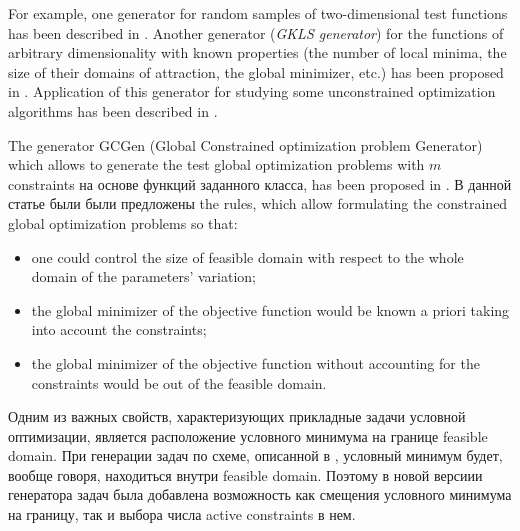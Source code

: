 \documentclass{aip-cp}
\begin{document}
For example, one generator for random samples of two-dimensional test functions has been described in \cite{Grishagin2015}. 
Another generator (\textit{GKLS generator}) for the functions of arbitrary dimensionality with known properties (the number of local minima, the size of their domains of attraction, the global minimizer, etc.) has been proposed in \cite{Gaviano2003}.  Application of this generator for studying some unconstrained optimization algorithms has been described in \cite{Paulavicius2014,Sergeyev2015}. 

The generator GCGen (Global Constrained optimization problem Generator) which allows to generate the test global optimization problems with $m$ constraints на основе функций заданного класса, has been proposed in \cite{Gergel2017}. В данной статье были были предложены the rules, which allow formulating the constrained global optimization problems so that:
\begin{itemize}
	\item one could control the size of feasible domain with respect to the whole domain of the parameters' variation;
	\item the global minimizer of the objective function would be known a priori taking into account the constraints;
	\item the global minimizer of the objective function without accounting for the constraints would be out of the feasible domain.
\end{itemize}


\Russian

Одним из важных свойств, характеризующих прикладные задачи условной оптимизации, является расположение условного минимума на границе feasible domain. При генерации задач по схеме, описанной в \cite{Gergel2017}, условный минимум будет, вообще говоря, находиться внутри feasible domain. Поэтому в новой версиии генератора задач была добавлена возможность как смещения условного минимума на границу, так и выбора числа active constraints в нем.
\end{document}
